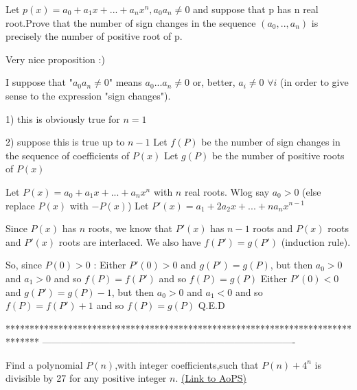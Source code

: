 \begin{solution}
	\begin{tcolorbox}Let $ p(x) = a_0 + a_1x + ... + a_nx^n,a_0a_n \neq 0$ and suppose that p has n real root.Prove that the number of sign changes in the sequence $ (a_0,..,a_n)$ is precisely the number of positive root of p.\end{tcolorbox}

Very nice proposition :)

I suppose that "$ a_0a_n\neq 0$" means $ a_0...a_n\neq 0$ or, better, $ a_i\neq 0$ $ \forall i$ (in order to give sense to the expression "sign changes").

1) this is obviously true for $ n=1$

2) suppose this is true up to $ n-1$
Let $ f(P)$ be the number of sign changes in the sequence of coefficients of $ P(x)$
Let $ g(P)$ be the number of positive roots of $ P(x)$

Let $ P(x)=a_0 + a_1x + ... + a_nx^n$ with $ n$ real roots. Wlog say $ a_0>0$ (else replace $ P(x)$ with $ -P(x)$)
Let $ P'(x)=a_1 + 2a_2x + ... + na_nx^{n-1}$

Since $ P(x)$ has $ n$ roots, we know that $ P'(x)$ has $ n-1$ roots and $ P(x)$ roots and $ P'(x)$ roots are interlaced.
We also have $ f(P')=g(P')$ (induction rule).

So, since $ P(0)>0$ :
Either $ P'(0)>0$ and $ g(P')=g(P)$, but then $ a_0>0$ and $ a_1>0$ and so $ f(P)=f(P')$ and so $ f(P)=g(P)$
Either $ P'(0)<0$ and $ g(P')=g(P)-1$, but then $ a_0>0$ and $ a_1<0$ and so $ f(P)=f(P')+1$ and so $ f(P)=g(P)$
Q.E.D
\end{solution}
*******************************************************************************
-------------------------------------------------------------------------------

\begin{problem}
	Find a polynomial $ P(n)$,with integer coefficients,such that $ P(n)+4^n$ is divisible by 27 for any positive integer $ n$.
	\flushright \href{https://artofproblemsolving.com/community/c6h276569}{(Link to AoPS)}
\end{problem}




